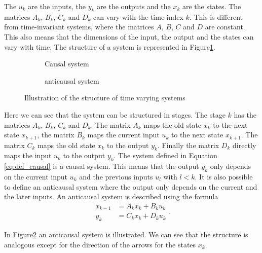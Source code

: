 \documentclass[doctype=mastersthesis,BCOR=15mm,biblatex]{ldvbook}%
\begin{document}
The $u_k$ are the inputs, the $y_k$ are the outputs and the $x_k$ are the states.
The matrices $A_k$, $B_k$, $C_k$ and $D_k$ can vary with the time index $k$.
This is different from time-invariant systems, where the matrices $A$, $B$, $C$ and $D$ are constant.
This also means that the dimensions of the input, the output and the states can vary with time.
The structure of a system is represented in Figure\ref{fig:struktur-system_a}.
\begin{figure}[htb]
	\centering
	\begin{subfigure}[b]{0.45\textwidth}
		\centering
		
		\caption{Causal system}
		\label{fig:struktur-system_a}
	\end{subfigure}
	\hspace{0.8cm}
	\begin{subfigure}[b]{0.45\textwidth}
		\centering
		
		\caption{anticausal system}
		\label{fig:struktur-system_b}
	\end{subfigure}
	\caption{Illustration of the structure of time varying systems}
	\label{fig:struktur-system}
\end{figure}
Here we can see that the system can be structured in stages.
The stage $k$ has the matrices $A_k$, $B_k$, $C_k$ and $D_k$.
The matrix $A_k$ maps the old state $x_k$ to the next state $x_{k+1}$, the matrix $B_k$ maps the current input $u_k$ to the next state $x_{k+1}$.
The matrix $C_k$ maps the old state $x_k$ to the output $y_k$.
Finally the matrix $D_k$ directly maps the input $u_k$ to the output $y_k$.
The system defined in Equation\,\ref{eq:def_causal} is a causal system.
This means that the output $y_k$ only depends on the current input $u_k$ and the previous inputs $u_l$ with $l < k$.
It is also possible to define an anticausal system where the output only depends on the current and the later inputs.
An anticausal system is described using the formula
\begin{subequations}
	\begin{align}
	x_{k-1} &= A_k x_k + B_k u_k \\
	y_k &= C_k x_k + D_k u_k 
	\end{align}.
	\label{eq:def_anticausal}
\end{subequations}

In Figure\ref{fig:struktur-system_b} an anticausal system is illustrated.
We can see that the structure is analogous except for the direction of the arrows for the states $x_k$. 
\end{document}
